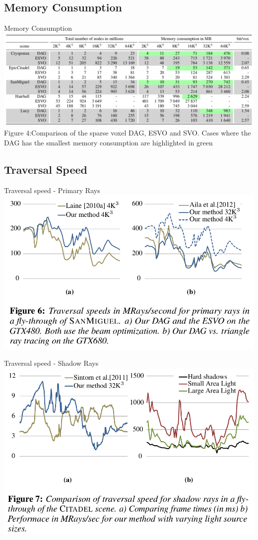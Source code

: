 \documentclass{beamer}
\begin{document}
\subsection{Memory Consumption}
\begin{frame}{Memory Consumption}
	\includegraphics[scale=0.27]{images/mem-consumption.png}{\\Figure 4:Comparison of the sparse voxel DAG, ESVO and SVO. Cases where the DAG has the smallest memory consumption are highlighted in green}
\end{frame}

\subsection{Traversal Speed}
\begin{frame}{Traversal speed - Primary Rays}
\includegraphics[scale=0.35]{images/primary.png}{}
\end{frame}

\begin{frame}{Traversal speed - Shadow Rays}
\includegraphics[scale=0.35]{images/shadow.png}{}
\end{frame}
\end{document}
